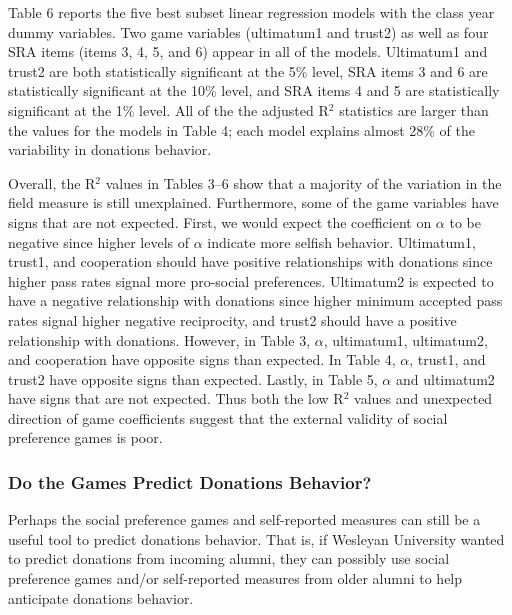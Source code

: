 \documentclass[12pt]{article}
\begin{document}
Table 6 reports the five best subset linear regression models with the class year dummy variables. Two game variables (ultimatum1 and trust2) as well as four SRA items (items 3, 4, 5, and 6) appear in all of the models. Ultimatum1 and trust2 are both statistically significant at the 5\% level, SRA items 3 and 6 are statistically significant at the 10\% level, and SRA items 4 and 5 are statistically significant at the 1\% level. All of the the adjusted R$^{2}$ statistics are larger than the values for the models in Table 4; each model explains almost 28\% of the variability in donations behavior. 

Overall, the R$^{2}$ values in Tables 3--6 show that a majority of the variation in the field measure is still unexplained. Furthermore, some of the game variables have signs that are not expected. First, we would expect the coefficient on \(\alpha\) to be negative since higher levels of \(\alpha\) indicate more selfish behavior. Ultimatum1, trust1, and cooperation should have positive relationships with donations since higher pass rates signal more pro-social preferences. Ultimatum2 is expected to have a negative relationship with donations since higher minimum accepted pass rates signal higher negative reciprocity, and trust2 should have a positive relationship with donations. However, in Table 3, \(\alpha\), ultimatum1, ultimatum2, and cooperation have opposite signs than expected. In Table 4, \(\alpha\), trust1, and trust2 have opposite signs than expected. Lastly, in Table 5, \(\alpha\) and ultimatum2 have signs that are not expected. Thus both the low R$^{2}$ values and unexpected direction of game coefficients suggest that the external validity of social preference games is poor.


\subsubsection{Do the Games Predict Donations Behavior?}

Perhaps the social preference games and self-reported measures can still be a useful tool to predict donations behavior. That is, if Wesleyan University wanted to predict donations from incoming alumni, they can possibly use social preference games and/or self-reported measures from older alumni to help anticipate donations behavior.
\end{document}
